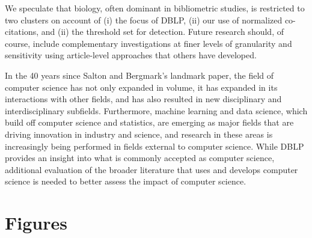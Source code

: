 We speculate that biology, often dominant in bibliometric studies, is restricted to two clusters on account of (i) the focus of DBLP,  (ii) our use of normalized co-citations, and (ii) the threshold set for detection. Future research should, of course, include complementary investigations at finer levels of granularity and sensitivity using article-level approaches that others have developed.

In the 40 years since Salton and Bergmark's landmark paper, the field of computer science has not only expanded in volume, it has expanded in its interactions with other fields, and has
also resulted in new disciplinary and interdisciplinary subfields. 
Furthermore, machine learning and data science, which build off computer science and statistics, 
are emerging as major fields that are driving innovation in industry and science, and research in these areas is increasingly being performed in
fields external to computer science.
While DBLP provides an insight into what is commonly accepted as computer science, additional evaluation of the broader literature that
uses and develops computer science is needed to better assess the impact of computer science.

\clearpage

\section*{Figures}

